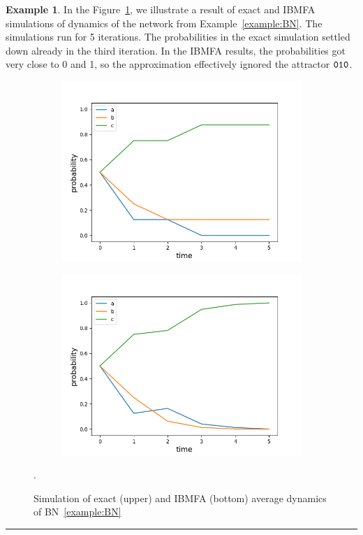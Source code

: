 \documentclass[
	digital, oneside, nosansbold, nocolorbold, nolot, nolof
]{fithesis4}
\theoremstyle{definition}
\theoremstyle{definition}
\newtheorem{example}{Example}
\newenvironment{lexample}
    {\begin{example}}
    {\par\hspace{\stretch{1}}\rule{0.2\textwidth}{0.01ex}\hspace{\stretch{1}}
     \par\end{example}}
\begin{document}
\begin{lexample}
In the Figure~\ref{fig:simulations}, we illustrate a result of exact and IBMFA
simulations of dynamics of the network from Example~\ref{example:BN}.
The simulations run for 5 iterations. The probabilities in the exact
simulation settled down already in the third iteration. In the IBMFA results,
the probabilities got very close to 0 and 1, so the approximation effectively
ignored the attractor $\mathtt{010}$.
\begin{figure}[!ht]
\centering
\begin{subfigure}{0.85\textwidth}
    \centering
    \includegraphics[width=\columnwidth]{example_brute_force.png}
\end{subfigure}
\begin{subfigure}{0.85\textwidth}
    \centering
    \includegraphics[width=\columnwidth]{example_ibmfa.png}
\end{subfigure}
\caption{Simulation of exact (upper) and IBMFA (bottom) average dynamics
    of BN~\ref{example:BN}}.
\label{fig:simulations}
\end{figure}
\end{lexample}
\end{document}
